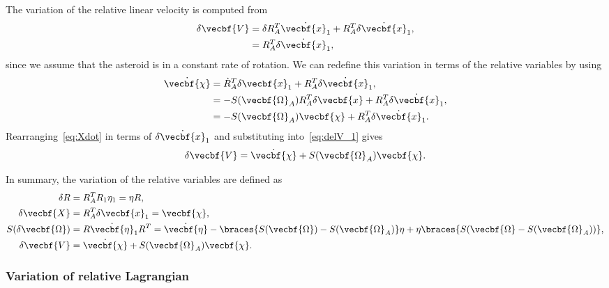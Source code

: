 \documentclass[11pt, reqno]{article}    %
\begin{document}
The variation of the relative linear velocity is computed from 
\begin{align}\label{eq:delV_1}
    \delta \vecbf{V} &= \delta R_A^T \dot{\vecbf{x}_1} + R_A^T \delta \dot{\vecbf{x}}_1 , \nonumber \\
    &= R_A^T \delta \dot{\vecbf{x}}_1 ,
\end{align}
since we assume that the asteroid is in a constant rate of rotation.
We can redefine this variation in terms of the relative variables by using
\begin{align}\label{eq:Xdot}
    \dot{\vecbf{\chi}} &= \dot{R}_A^T \delta \vecbf{x}_1 + R_A^T \delta \dot{\vecbf{x}}_1 , \nonumber \\
    &= -S(\vecbf{\Omega}_A) R_A^T \delta \vecbf{x} + R_A^T \delta \dot{\vecbf{x}}_1 ,\nonumber \\
    &= -S(\vecbf{\Omega}_A) \vecbf{\chi} + R_A^T \delta \dot{\vecbf{x}}_1 .
\end{align}
Rearranging~\cref{eq:Xdot} in terms of \( \delta \dot{\vecbf{x}}_1\) and substituting into~\cref{eq:delV_1} gives
\begin{align}\label{eq:relative_velocity_variation}
    \delta \vecbf{V} = \dot{\vecbf{\chi}} + S(\vecbf{\Omega}_A) \vecbf{\chi} .
\end{align}

In summary, the variation of the relative variables are defined as
\begin{align*}
    \delta R &= R_A^T R_1 \eta_1 = \eta R ,\\
    \delta \vecbf{X} &= R_A^T \delta \vecbf{x}_1 = \vecbf{\chi} , \\
    S(\delta \vecbf{\Omega}) &= R \dot{\vecbf{\eta}}_1 R^T = \dot{\vecbf{\eta}} - \braces{S(\vecbf{\Omega})-S(\vecbf{\Omega}_A)} \eta + \eta \braces{S(\vecbf{\Omega}-S(\vecbf{\Omega}_A))} , \\
    \delta \vecbf{V} &= \dot{\vecbf{\chi}} + S(\vecbf{\Omega}_A) \vecbf{\chi} .
\end{align*}
\subsubsection{Variation of relative Lagrangian}\label{ssec:var_rel_lagrangian}
\end{document}
